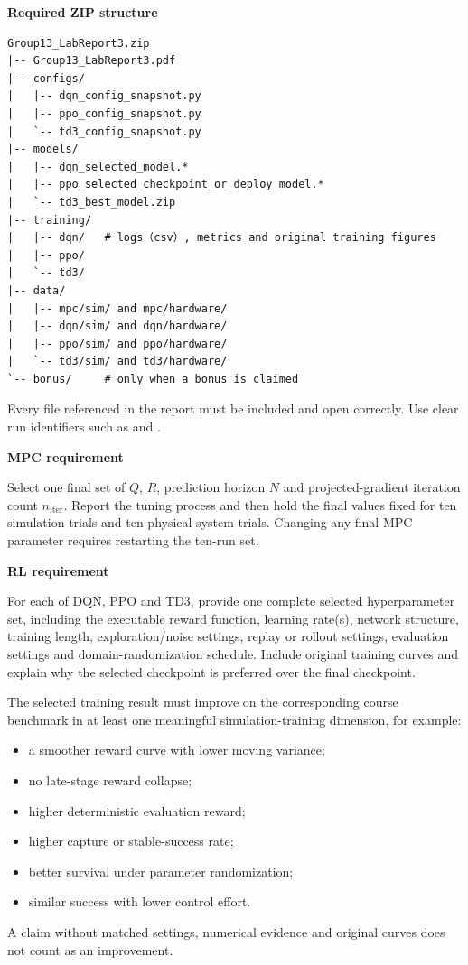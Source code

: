 \documentclass[11pt,a4paper]{article}
\newcommand{\code}[1]{\texttt{\detokenize{#1}}}
\begin{document}
\begin{requirementbox}
\textbf{Required ZIP structure}
\begin{verbatim}
Group13_LabReport3.zip
|-- Group13_LabReport3.pdf
|-- configs/
|   |-- dqn_config_snapshot.py
|   |-- ppo_config_snapshot.py
|   `-- td3_config_snapshot.py
|-- models/
|   |-- dqn_selected_model.*
|   |-- ppo_selected_checkpoint_or_deploy_model.*
|   `-- td3_best_model.zip
|-- training/
|   |-- dqn/   # logs（csv）, metrics and original training figures
|   |-- ppo/
|   `-- td3/
|-- data/
|   |-- mpc/sim/ and mpc/hardware/
|   |-- dqn/sim/ and dqn/hardware/
|   |-- ppo/sim/ and ppo/hardware/
|   `-- td3/sim/ and td3/hardware/
`-- bonus/     # only when a bonus is claimed
\end{verbatim}
Every file referenced in the report must be included and open correctly. Use
clear run identifiers such as \code{TD3_SIM_R01.csv} and
\code{TD3_HW_R01.png}.
\end{requirementbox}

\begin{requirementbox}
\textbf{MPC requirement}

Select one final set of $Q$, $R$, prediction horizon $N$ and projected-gradient
iteration count $n_{\mathrm{iter}}$. Report the tuning process and then hold the
final values fixed for ten simulation trials and ten physical-system trials.
Changing any final MPC parameter requires restarting the ten-run set.
\end{requirementbox}

\begin{requirementbox}
\textbf{RL requirement}

For each of DQN, PPO and TD3, provide one complete selected hyperparameter set,
including the executable reward function, learning rate(s), network structure,
training length, exploration/noise settings, replay or rollout settings,
evaluation settings and domain-randomization schedule. Include original
training curves and explain why the selected checkpoint is preferred over the
final checkpoint.

The selected training result must improve on the corresponding course benchmark
in at least one meaningful simulation-training dimension, for example:
\begin{itemize}
  \item a smoother reward curve with lower moving variance;
  \item no late-stage reward collapse;
  \item higher deterministic evaluation reward;
  \item higher capture or stable-success rate;
  \item better survival under parameter randomization;
  \item similar success with lower control effort.
\end{itemize}
A claim without matched settings, numerical evidence and original curves does
not count as an improvement.
\end{requirementbox}
\end{document}
